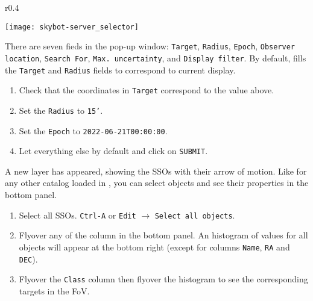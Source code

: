 \begin{wrapfigure}[11]{r}{0.4\textwidth}
  \vspace{-2.5em}
  \begin{center}
    \texttt{[image: skybot-server\_selector]}
  \end{center}
\end{wrapfigure}

  There are seven fieds in the pop-up window:
  \texttt{Target},
  \texttt{Radius},
  \texttt{Epoch},
  \texttt{Observer location},
  \texttt{Search For},
  \texttt{Max. uncertainty}, and
  \texttt{Display filter}.
  By default, \aladin fills the
  \texttt{Target} and
  \texttt{Radius} fields to correspond to current display.

  \begin{enumerate}
    \setlength\itemsep{0em}
    \setcounter{enumi}{\value{saveitem}}
    \item Check that the coordinates in \texttt{Target} correspond to the value above.

    \item Set the \texttt{Radius} to \texttt{15'}.

    \item Set the \texttt{Epoch} to \texttt{2022-06-21T00:00:00}.

    \item Let everything else by default and click on \texttt{SUBMIT}.
  \end{enumerate}
  \setcounter{saveitem}{\value{enumi}}  

  A new layer has appeared, showing the SSOs with their
  arrow of motion. Like for any other catalog loaded in \aladin,
  you can select objects and see their properties in the bottom panel.

  \begin{enumerate}
    \setlength\itemsep{0em}
    \setcounter{enumi}{\value{saveitem}}
    \item Select all SSOs. \texttt{Ctrl-A} or \texttt{Edit} $\rightarrow$ \texttt{Select all objects}.
    \item Flyover any of the column in the bottom panel. An histogram of values for all objects will 
          appear at the bottom right (except for columns \texttt{Name}, \texttt{RA} and \texttt{DEC}).
    \item Flyover the \texttt{Class} column then flyover the histogram to see the corresponding 
          targets in the FoV.
  \end{enumerate}

